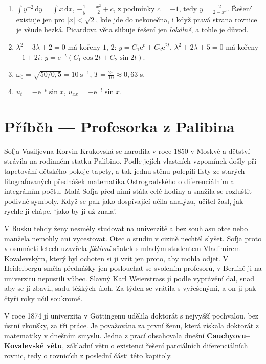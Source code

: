 \begin{solution}
  \begin{enumerate}[label=(\alph*)]
    \item $\int y^{-2}\,\mathrm{d}y = \int x\,\mathrm{d}x$, $-\frac{1}{y} = \frac{x^2}{2} + c$, z podmínky $c = -1$, tedy $y = \frac{2}{2 - x^2}$. Řešení existuje jen pro $|x| < \sqrt{2}$, kde jde do nekonečna, i když pravá strana rovnice je všude hezká. Picardova věta slibuje řešení jen \textit{lokálně}, a tohle je důvod.
    \item $\lambda^2 - 3\lambda + 2 = 0$ má kořeny $1$, $2$: $y = C_1\mathrm{e}^t + C_2\mathrm{e}^{2t}$. $\lambda^2 + 2\lambda + 5 = 0$ má kořeny $-1\pm 2i$: $y = \mathrm{e}^{-t}(C_1\cos 2t + C_2\sin 2t)$.
    \item $\omega_0 = \sqrt{50/0{,}5} = 10\ \mathrm{s}^{-1}$, $T = \frac{2\pi}{10}\approx 0{,}63$ s.
    \item $u_t = -\mathrm{e}^{-t}\sin x$, $u_{xx} = -\mathrm{e}^{-t}\sin x$.
  \end{enumerate}
\end{solution}

\section{Příběh --- Profesorka z Palibina}

Sofja Vasiljevna Korvin-Krukovská se narodila v roce 1850 v Moskvě a dětství strávila na rodinném statku Palibino. Podle jejích vlastních vzpomínek došly při tapetování dětského pokoje tapety, a tak jednu stěnu polepili listy ze starých litografovaných přednášek matematika Ostrogradského o diferenciálním a integrálním počtu. Malá Sofja před nimi stála celé hodiny a snažila se rozluštit podivné symboly. Když se pak jako dospívající učila analýzu, učitel žasl, jak rychle ji chápe, `jako by ji už znala'.

V Rusku tehdy ženy nesměly studovat na univerzitě a bez souhlasu otce nebo manžela nemohly ani vycestovat. Otec o studiu v cizině nechtěl slyšet. Sofja proto v osmnácti letech uzavřela \textit{fiktivní} sňatek s mladým studentem Vladimirem Kovalevským, který byl ochoten si ji vzít jen proto, aby mohla odjet. V Heidelbergu směla přednášky jen poslouchat se svolením profesorů, v Berlíně ji na univerzitu nepustili vůbec. Slavný Karl Weierstrass jí podle vyprávění dal, snad aby se jí zbavil, sadu těžkých úloh. Za týden se vrátila s vyřešenými, a on ji pak čtyři roky učil soukromě.

V roce 1874 jí univerzita v Göttingenu udělila doktorát s nejvyšší pochvalou, bez ústní zkoušky, za tři práce. Je považována za první ženu, která získala doktorát z matematiky v dnešním smyslu. Jedna z prací obsahovala dnešní \textbf{Cauchyovu--Kovalevské větu}, základní větu o existenci řešení parciálních diferenciálních rovnic, tedy o rovnicích z poslední části této kapitoly.


